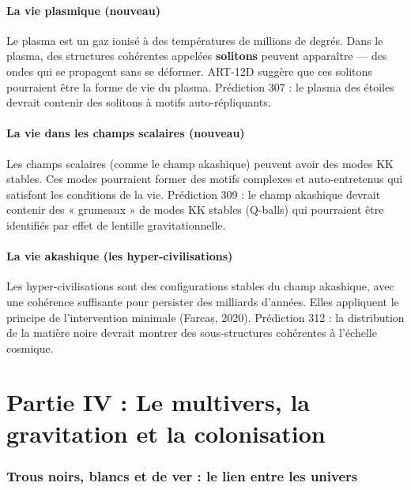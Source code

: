 \documentclass[11pt,a4paper]{article}
\begin{document}
\subsection{La vie plasmique (nouveau)}
Le plasma est un gaz ionisé à des températures de millions de degrés. Dans le plasma, des structures cohérentes appelées \textbf{solitons} peuvent apparaître --- des ondes qui se propagent sans se déformer. ART-12D suggère que ces solitons pourraient être la forme de vie du plasma. Prédiction 307 : le plasma des étoiles devrait contenir des solitons à motifs auto-répliquants.

\subsection{La vie dans les champs scalaires (nouveau)}
Les champs scalaires (comme le champ akashique) peuvent avoir des modes KK stables. Ces modes pourraient former des motifs complexes et auto-entretenus qui satisfont les conditions de la vie. Prédiction 309 : le champ akashique devrait contenir des « grumeaux » de modes KK stables (Q-balls) qui pourraient être identifiés par effet de lentille gravitationnelle.

\subsection{La vie akashique (les hyper-civilisations)}
Les hyper-civilisations sont des configurations stables du champ akashique, avec une cohérence suffisante pour persister des milliards d'années. Elles appliquent le principe de l'intervention minimale (Farcaș, 2020). Prédiction 312 : la distribution de la matière noire devrait montrer des sous-structures cohérentes à l'échelle cosmique.

\newpage
\part*{Partie IV : Le multivers, la gravitation et la colonisation}

\section{Trous noirs, blancs et de ver : le lien entre les univers}
\end{document}
